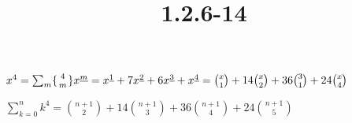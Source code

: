 \documentclass{article}
\title{1.2.6-14}
\begin{document}
\maketitle

$x^4 = \sum_{m}\{{4\atop m} \}x^{\underline{m}} = x^{\underline{1}} + 7 x^{\underline{2}} + 6 x^{\underline{3}} + x^{\underline{4}} = \binom{x}{1} + 14 \binom{x}{2} + 36 \binom{3}{1} + 24 \binom{x}{4}$

$\sum_{k=0}^n k^4 = \binom{n+1}{2} + 14 \binom{n+1}{3} + 36 \binom{n+1}{4} + 24 \binom{n+1}{5}$
\end{document}
